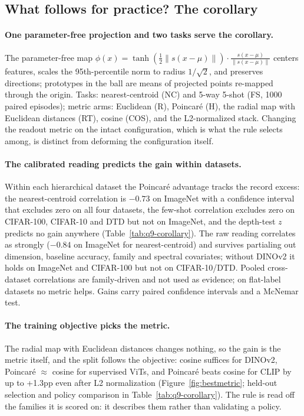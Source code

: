 \documentclass{article}
\theoremstyle{definition}
\theoremstyle{plain}
\theoremstyle{remark}
\begin{document}
\FloatBarrier
\subsection{What follows for practice? The corollary}
\label{app:corollary}
\label{app:familycorr}
\paragraph{One parameter-free projection and two tasks serve the corollary.} The parameter-free map $\phi(x)=\tanh(\tfrac12\|s(x-\mu)\|)\cdot\frac{s(x-\mu)}{\|s(x-\mu)\|}$ centers features, scales the 95th-percentile norm to radius $1/\sqrt2$, and preserves directions; prototypes in the ball are means of projected points re-mapped through the origin. Tasks: nearest-centroid (NC) and 5-way 5-shot (FS, 1000 paired episodes); metric arms: Euclidean (R), Poincar\'{e} (H), the radial map with Euclidean distances (RT), cosine (COS), and the L2-normalized stack. Changing the readout metric on the intact configuration, which is what the rule selects among, is distinct from deforming the configuration itself. %

\paragraph{The calibrated reading predicts the gain within datasets.} Within each hierarchical dataset the Poincar\'{e} advantage tracks the record excess: the nearest-centroid correlation is $-0.73$ on ImageNet with a confidence interval that excludes zero on all four datasets, the few-shot correlation excludes zero on CIFAR-100, CIFAR-10 and DTD but not on ImageNet, and the depth-test $z$ predicts no gain anywhere (Table~\ref{tab:q9-corollary}). The raw reading correlates as strongly ($-0.84$ on ImageNet for nearest-centroid) and survives partialing out dimension, baseline accuracy, family and spectral covariates; without DINOv2 it holds on ImageNet and CIFAR-100 but not on CIFAR-10/DTD. Pooled cross-dataset correlations are family-driven and not used as evidence; on flat-label datasets no metric helps. Gains carry paired confidence intervals and a McNemar test. %

\paragraph{The training objective picks the metric.} The radial map with Euclidean distances changes nothing, so the gain is the metric itself, and the split follows the objective: cosine suffices for DINOv2, Poincar\'{e} $\approx$ cosine for supervised ViTs, and Poincar\'{e} beats cosine for CLIP by up to +1.3pp even after L2 normalization (Figure~\ref{fig:bestmetric}; held-out selection and policy comparison in Table~\ref{tab:q9-corollary}). The rule is read off the families it is scored on: it describes them rather than validating a policy. %
\end{document}
